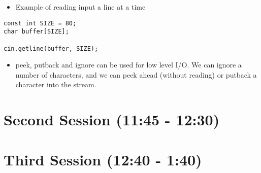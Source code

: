 \documentclass[11pt]{article}
\begin{document}
\begin{itemize}
\item Example of reading input a line at a time
\end{itemize}

\begin{verbatim}
const int SIZE = 80;
char buffer[SIZE];

cin.getline(buffer, SIZE);
\end{verbatim}

\begin{itemize}
\item peek, putback and ignore can be used for low level I/O.  We can
ignore a number of characters, and we can peek ahead (without
reading) or putback a character into the stream.
\end{itemize}


\section{Second Session (11:45 - 12:30)}
\label{sec-2}

\section{Third Session (12:40 - 1:40)}
\label{sec-3}
\end{document}

